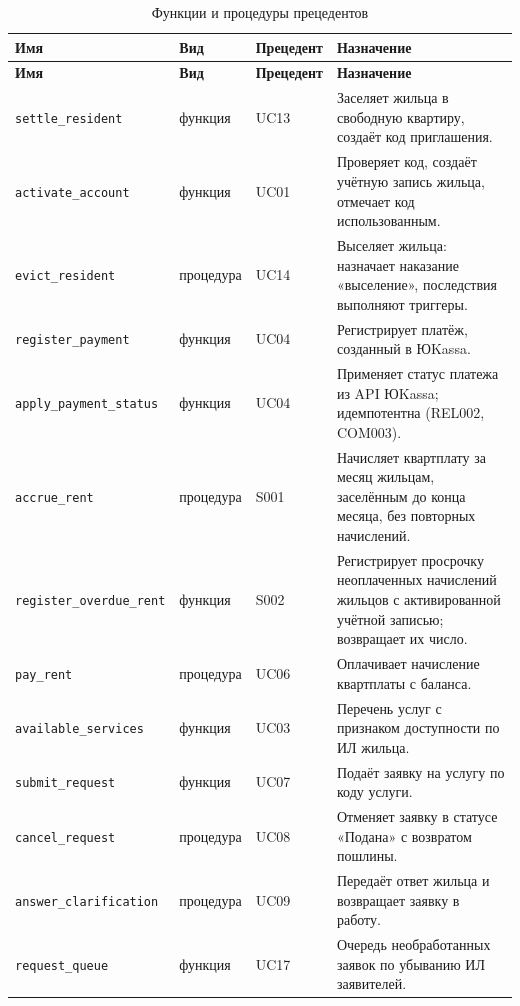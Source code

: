 \documentclass[12pt,a4paper]{article}
\begin{document}
\begin{longtable}{L{40.0mm} L{19.1mm} L{21.0mm} L{72.4mm}}
\caption{Функции и процедуры прецедентов}\label{tab:functions}\\
\toprule \textbf{Имя} & \textbf{Вид} & \textbf{Прецедент} & \textbf{Назначение} \\ \midrule
\endfirsthead
\toprule \textbf{Имя} & \textbf{Вид} & \textbf{Прецедент} & \textbf{Назначение} \\ \midrule
\endhead
\bottomrule
\endfoot
\texttt{settle\_\allowbreak{}resident} & функция & UC13 & Заселяет жильца в свободную квартиру, создаёт код приглашения. \\
\texttt{activate\_\allowbreak{}account} & функция & UC01 & Проверяет код, создаёт учётную запись жильца, отмечает код использованным. \\
\texttt{evict\_\allowbreak{}resident} & процедура & UC14 & Выселяет жильца: назначает наказание «выселение», последствия выполняют триггеры. \\
\texttt{register\_\allowbreak{}payment} & функция & UC04 & Регистрирует платёж, созданный в ЮKassa. \\
\texttt{apply\_\allowbreak{}payment\_\allowbreak{}status} & функция & UC04 & Применяет статус платежа из API ЮKassa; идемпотентна (REL002, COM003). \\
\texttt{accrue\_\allowbreak{}rent} & процедура & S001 & Начисляет квартплату за месяц жильцам, заселённым до конца месяца, без повторных начислений. \\
\texttt{register\_\allowbreak{}overdue\_\allowbreak{}rent} & функция & S002 & Регистрирует просрочку неоплаченных начислений жильцов с активированной учётной записью; возвращает их число. \\
\texttt{pay\_\allowbreak{}rent} & процедура & UC06 & Оплачивает начисление квартплаты с баланса. \\
\texttt{available\_\allowbreak{}services} & функция & UC03 & Перечень услуг с признаком доступности по ИЛ жильца. \\
\texttt{submit\_\allowbreak{}request} & функция & UC07 & Подаёт заявку на услугу по коду услуги. \\
\texttt{cancel\_\allowbreak{}request} & процедура & UC08 & Отменяет заявку в статусе «Подана» с возвратом пошлины. \\
\texttt{answer\_\allowbreak{}clarification} & процедура & UC09 & Передаёт ответ жильца и возвращает заявку в работу. \\
\texttt{request\_\allowbreak{}queue} & функция & UC17 & Очередь необработанных заявок по убыванию ИЛ заявителей. \\

\end{longtable}
\end{document}
